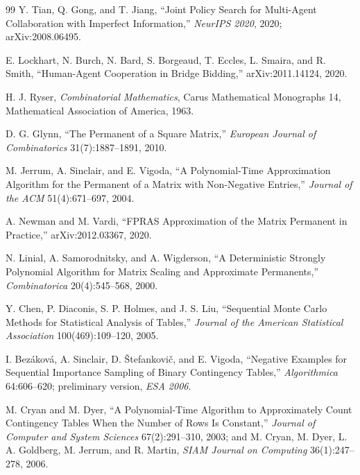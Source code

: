 \begin{thebibliography}{99}
Y. Tian, Q. Gong, and T. Jiang, ``Joint Policy Search for Multi-Agent
Collaboration with Imperfect Information,'' \emph{NeurIPS 2020}, 2020;
arXiv:2008.06495.

E. Lockhart, N. Burch, N. Bard, S. Borgeaud, T. Eccles, L. Smaira, and R. Smith,
``Human-Agent Cooperation in Bridge Bidding,'' arXiv:2011.14124, 2020.


H. J. Ryser, \emph{Combinatorial Mathematics}, Carus Mathematical Monographs 14,
Mathematical Association of America, 1963.

D. G. Glynn, ``The Permanent of a Square Matrix,'' \emph{European Journal of
Combinatorics} 31(7):1887--1891, 2010.

M. Jerrum, A. Sinclair, and E. Vigoda, ``A Polynomial-Time Approximation
Algorithm for the Permanent of a Matrix with Non-Negative Entries,''
\emph{Journal of the ACM} 51(4):671--697, 2004.

A. Newman and M. Vardi, ``FPRAS Approximation of the Matrix Permanent in
Practice,'' arXiv:2012.03367, 2020.

N. Linial, A. Samorodnitsky, and A. Wigderson, ``A Deterministic Strongly
Polynomial Algorithm for Matrix Scaling and Approximate Permanents,''
\emph{Combinatorica} 20(4):545--568, 2000.

Y. Chen, P. Diaconis, S. P. Holmes, and J. S. Liu, ``Sequential Monte Carlo
Methods for Statistical Analysis of Tables,'' \emph{Journal of the American
Statistical Association} 100(469):109--120, 2005.

I. Bez\'akov\'a, A. Sinclair, D. \v{S}tefankovi\v{c}, and E. Vigoda, ``Negative
Examples for Sequential Importance Sampling of Binary Contingency Tables,''
\emph{Algorithmica} 64:606--620; preliminary version, \emph{ESA 2006}.

M. Cryan and M. Dyer, ``A Polynomial-Time Algorithm to Approximately Count
Contingency Tables When the Number of Rows Is Constant,'' \emph{Journal of
Computer and System Sciences} 67(2):291--310, 2003; and M. Cryan, M. Dyer,
L. A. Goldberg, M. Jerrum, and R. Martin, \emph{SIAM Journal on Computing}
36(1):247--278, 2006.


\end{thebibliography}
